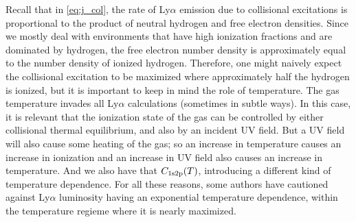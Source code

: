 Recall that in \ref{eq:j_col}, the rate of Ly$\alpha$ emission due to collisional excitations is proportional to the product of neutral hydrogen and free electron densities.
Since we mostly deal with environments that have high ionization fractions and are dominated by hydrogen, the free electron number density is approximately equal to the number density of ionized hydrogen.
Therefore, one might naively expect the collisional excitation to be maximized where approximately half the hydrogen is ionized, but it is important to keep in mind the role of temperature.
The gas temperature invades all Ly$\alpha$ calculations (sometimes in subtle ways).
In this case, it is relevant that the ionization state of the gas can be controlled by either collisional thermal equilibrium, and also by an incident UV field.
But a UV field will also cause some heating of the gas; so an increase in temperature causes an increase in ionization and an increase in UV field also causes an increase in temperature.
And we also have that $C_{\rm 1s2p}(T)$, introducing a different kind of temperature dependence.
For all these reasons, some authors \citep[e.g.][]{Faucher-Giguere2010} have cautioned against Ly$\alpha$ luminosity having an exponential temperature dependence, within the temperature regieme where it is nearly maximized.

